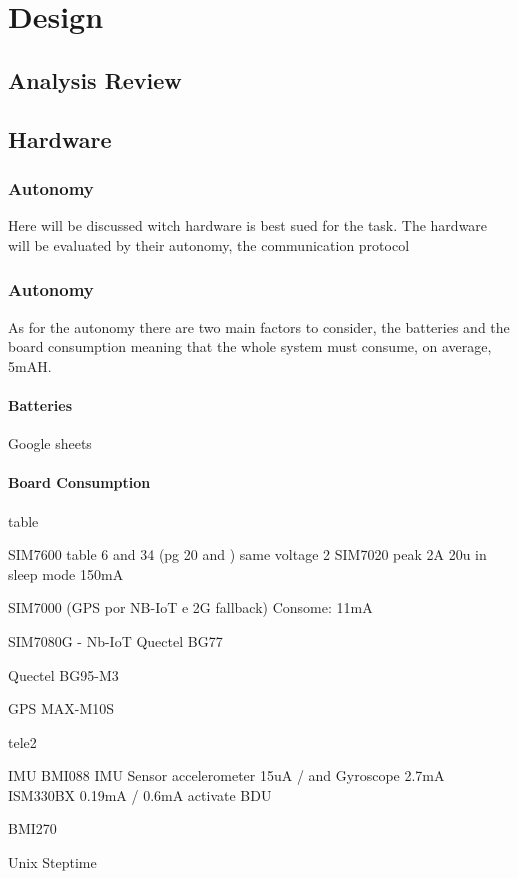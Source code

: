 
\chapter{Design}
\section{Analysis Review}

\section{Hardware}
\subsection{Autonomy}
Here will be discussed witch hardware is best sued for the task. The hardware will be evaluated by their
autonomy, the communication protocol
\subsection{Autonomy}
As for the autonomy there are two main factors to consider, the batteries and the board consumption
meaning that the whole system must consume, on average, 5mAH.
\subsubsection{Batteries}
Google sheets
\subsubsection{Board Consumption}

table

SIM7600 
table 6 and 34 (pg 20 and ) same voltage
2
SIM7020
peak 2A 20u in sleep mode 150mA

SIM7000 (GPS por NB-IoT e 2G fallback)
Consome: 11mA

SIM7080G - Nb-IoT
Quectel BG77

Quectel BG95-M3

 
GPS
MAX-M10S

tele2

IMU
BMI088 IMU Sensor
accelerometer 15uA  / and Gyroscope 2.7mA
ISM330BX
0.19mA / 0.6mA
activate BDU

BMI270


Unix Steptime

